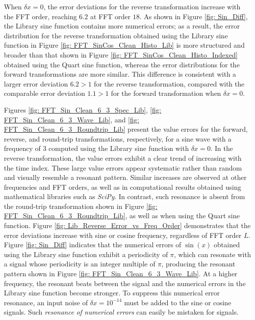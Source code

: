 \documentclass[twoside]{article}
\numberwithin{equation}{section}
\begin{document}
When $\delta x = 0$, the error deviations for the reverse transformation increase with the FFT order, reaching $6.2$ at FFT order $18$.
As shown in Figure \ref{fig: Sin_Diff}, the Library sine function contains more numerical errors; as a result, the error distribution for the reverse transformation obtained using the Library sine function in Figure \ref{fig: FFT_SinCos_Clean_Histo_Lib} is more structured and broader than that shown in Figure \ref{fig: FFT_SinCos_Clean_Histo_Indexed} obtained using the Quart sine function, whereas the error distributions for the forward transformations are more similar.
This difference is consistent with a larger error deviation $6.2 > 1$ for the reverse transformation, compared with the comparable error deviation $1.1 > 1$ for the forward transformation when $\delta x = 0$.

Figures \ref{fig: FFT_Sin_Clean_6_3_Spec_Lib}, \ref{fig: FFT_Sin_Clean_6_3_Wave_Lib}, and \ref{fig: FFT_Sin_Clean_6_3_Roundtrip_Lib} present the value errors for the forward, reverse, and round-trip transformations, respectively, for a sine wave with a frequency of $3$ computed using the Library sine function with $\delta x = 0$.
In the reverse transformation, the value errors exhibit a clear trend of increasing with the time index. 
These large value errors appear systematic rather than random and visually resemble a resonant pattern.
Similar increases are observed at other frequencies and FFT orders, as well as in computational results obtained using mathematical libraries such as \textit{SciPy}.
In contrast, such resonance is absent from the round-trip transformation shown in Figure \ref{fig: FFT_Sin_Clean_6_3_Roundtrip_Lib}, as well as when using the Quart sine function.
Figure \ref{fig: Lib_Reverse_Error_vs_Freq_Order} demonstrates that the error deviations increase with sine or cosine frequency, regardless of FFT order $L$.
Figure \ref{fig: Sin_Diff} indicates that the numerical errors of $\sin(x)$ obtained using the Library sine function exhibit a periodicity of $\pi$, which can resonate with a signal whose periodicity is an integer multiple of $\pi$, producing the resonant pattern shown in Figure \ref{fig: FFT_Sin_Clean_6_3_Wave_Lib}.
At a higher frequency, the resonant beats between the signal and the numerical errors in the Library sine function become stronger.
To suppress this numerical error resonance, an input noise of $\delta x = 10^{-14}$ must be added to the sine or cosine signals.
Such \emph{resonance of numerical errors} can easily be mistaken for signals.
\end{document}

